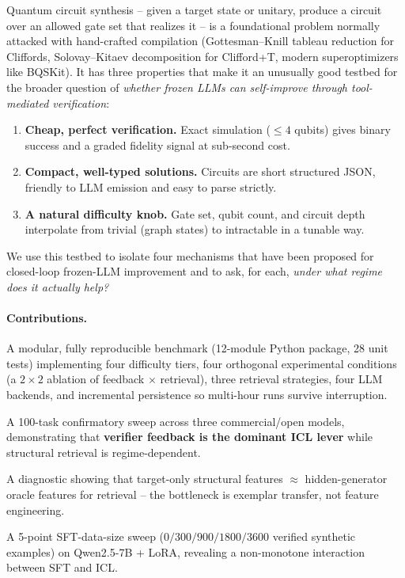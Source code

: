 \documentclass[11pt]{article}
\begin{document}
Quantum circuit synthesis -- given a target state or unitary, produce a circuit over an allowed gate set that realizes it -- is a foundational problem normally attacked with hand-crafted compilation (Gottesman--Knill tableau reduction for Cliffords, Solovay--Kitaev decomposition for Clifford+T, modern superoptimizers like BQSKit). It has three properties that make it an unusually good testbed for the broader question of \emph{whether frozen LLMs can self-improve through tool-mediated verification}:
\begin{enumerate}[leftmargin=*,topsep=2pt]
    \item \textbf{Cheap, perfect verification.} Exact simulation ($\leq 4$ qubits) gives binary success and a graded fidelity signal at sub-second cost.
    \item \textbf{Compact, well-typed solutions.} Circuits are short structured JSON, friendly to LLM emission and easy to parse strictly.
    \item \textbf{A natural difficulty knob.} Gate set, qubit count, and circuit depth interpolate from trivial (graph states) to intractable in a tunable way.
\end{enumerate}

We use this testbed to isolate four mechanisms that have been proposed for closed-loop frozen-LLM improvement and to ask, for each, \emph{under what regime does it actually help?}

\paragraph{Contributions.}
\begin{description}[leftmargin=*,topsep=2pt,itemsep=0pt]
    \item[\textbf{C1.}] A modular, fully reproducible benchmark (12-module Python package, 28 unit tests) implementing four difficulty tiers, four orthogonal experimental conditions (a $2\times2$ ablation of feedback $\times$ retrieval), three retrieval strategies, four LLM backends, and incremental persistence so multi-hour runs survive interruption.
    \item[\textbf{C2.}] A 100-task confirmatory sweep across three commercial/open models, demonstrating that \textbf{verifier feedback is the dominant ICL lever} while structural retrieval is regime-dependent.
    \item[\textbf{C3.}] A diagnostic showing that target-only structural features $\approx$ hidden-generator oracle features for retrieval -- the bottleneck is exemplar transfer, not feature engineering.
    \item[\textbf{C4.}] A 5-point SFT-data-size sweep ($0/300/900/1800/3600$ verified synthetic examples) on Qwen2.5-7B + LoRA, revealing a non-monotone interaction between SFT and ICL.
\end{description}
\end{document}
